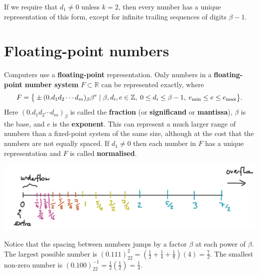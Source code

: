 \documentclass[
  letterpaper,
  DIV=11,
  numbers=noendperiod]{scrreprt}
\begin{document}
If we require that \(d_1\neq 0\) unless \(k=2\), then every number has a
unique representation of this form, except for infinite trailing
sequences of digits \(\beta - 1\).

\section{Floating-point numbers}\label{floating-point-numbers}

Computers use a \textbf{floating-point} representation. Only numbers in
a \textbf{floating-point number system} \(F\subset\mathbb{R}\) can be
represented exactly, where \[
F = \big\{ \pm (0.d_1d_2\cdots d_{m})_\beta\beta^e \;| \;  \beta, d_i, e \in \mathbb{Z}, \;0 \leq d_i \leq \beta-1, \;e_{\rm min} \leq e \leq e_{\rm max}\big\}.
\] Here \((0.d_1d_2\cdots d_{m})_\beta\) is called the \textbf{fraction}
(or \textbf{significand} or \textbf{mantissa}), \(\beta\) is the base,
and \(e\) is the \textbf{exponent}. This can represent a much larger
range of numbers than a fixed-point system of the same size, although at
the cost that the numbers are not equally spaced. If \(d_1\neq 0\) then
each number in \(F\) has a unique representation and \(F\) is called
\textbf{normalised}.

\begin{center}
\includegraphics[width=0.9\linewidth,height=\textheight,keepaspectratio]{im/fp1.jpg}
\end{center}

\begin{tcolorbox}[enhanced jigsaw, toptitle=1mm, breakable, colbacktitle=quarto-callout-note-color!10!white, colback=white, opacitybacktitle=0.6, rightrule=.15mm, bottomrule=.15mm, left=2mm, arc=.35mm, bottomtitle=1mm, title=\textcolor{quarto-callout-note-color}{\faInfo}\hspace{0.5em}{Note}, titlerule=0mm, toprule=.15mm, leftrule=.75mm, opacityback=0, colframe=quarto-callout-note-color-frame, coltitle=black]

Notice that the spacing between numbers jumps by a factor \(\beta\) at
each power of \(\beta\). The largest possible number is
\((0.111)_22^2 = (\tfrac12 + \tfrac14 + \tfrac18)(4) = \tfrac72\). The
smallest non-zero number is
\((0.100)_22^{-1}=\tfrac12(\tfrac12) = \tfrac14\).

\end{tcolorbox}
\end{document}

